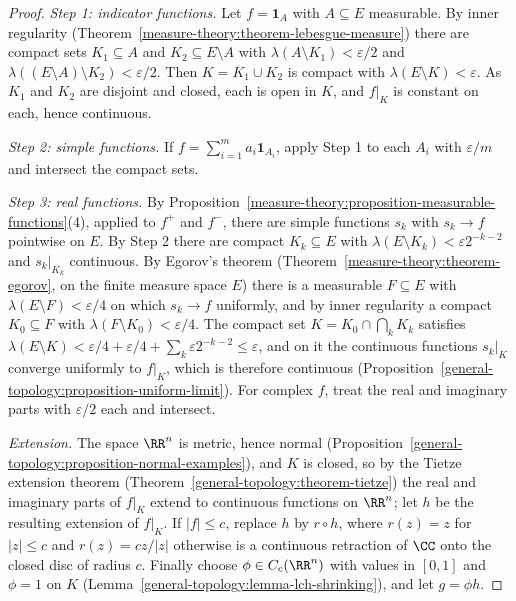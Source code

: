\begin{proof}
\emph{Step 1: indicator functions.} Let $f = \mathbf{1}_A$ with $A \subseteq E$ measurable. By inner regularity
(Theorem~\ref{measure-theory:theorem-lebesgue-measure}) there are compact sets $K_1 \subseteq A$ and $K_2 \subseteq E \setminus A$ with
$\lambda(A \setminus K_1) < \varepsilon/2$ and $\lambda((E \setminus A) \setminus K_2) < \varepsilon/2$. Then $K = K_1 \cup K_2$ is compact with $\lambda(E \setminus K) < \varepsilon$.
As $K_1$ and $K_2$ are disjoint and closed, each is open in $K$, and $f|_K$ is constant on each, hence continuous.

\emph{Step 2: simple functions.} If $f = \sum_{i=1}^ma_i\mathbf{1}_{A_i}$, apply Step 1 to each $A_i$ with $\varepsilon/m$ and intersect the compact sets.

\emph{Step 3: real functions.} By Proposition~\ref{measure-theory:proposition-measurable-functions}(4), applied to $f^+$ and $f^-$, there are simple functions
$s_k$ with $s_k \to f$ pointwise on $E$. By Step 2 there are compact $K_k \subseteq E$ with $\lambda(E \setminus K_k) < \varepsilon2^{-k-2}$ and $s_k|_{K_k}$
continuous. By Egorov's theorem (Theorem~\ref{measure-theory:theorem-egorov}, on the finite measure space $E$) there is a measurable $F \subseteq E$ with
$\lambda(E \setminus F) < \varepsilon/4$ on which $s_k \to f$ uniformly, and by inner regularity a compact $K_0 \subseteq F$ with $\lambda(F \setminus K_0) < \varepsilon/4$.
The compact set $K = K_0 \cap \bigcap_kK_k$ satisfies $\lambda(E \setminus K) < \varepsilon/4 + \varepsilon/4 + \sum_k\varepsilon2^{-k-2} \leq \varepsilon$, and on it the
continuous functions $s_k|_K$ converge uniformly to $f|_K$, which is therefore continuous (Proposition~\ref{general-topology:proposition-uniform-limit}). For
complex $f$, treat the real and imaginary parts with $\varepsilon/2$ each and intersect.

\emph{Extension.} The space $\RR^n$ is metric, hence normal (Proposition~\ref{general-topology:proposition-normal-examples}), and $K$ is closed, so by the Tietze
extension theorem (Theorem~\ref{general-topology:theorem-tietze}) the real and imaginary parts of $f|_K$ extend to continuous functions on $\RR^n$; let $h$ be the
resulting extension of $f|_K$. If $|f| \leq c$, replace $h$ by $r \circ h$, where $r(z) = z$ for $|z| \leq c$ and $r(z) = cz/|z|$ otherwise is a continuous retraction
of $\CC$ onto the closed disc of radius $c$. Finally choose $\phi \in C_c(\RR^n)$ with values in $[0, 1]$ and $\phi = 1$ on $K$
(Lemma~\ref{general-topology:lemma-lch-shrinking}), and let $g = \phi h$.
\end{proof}

